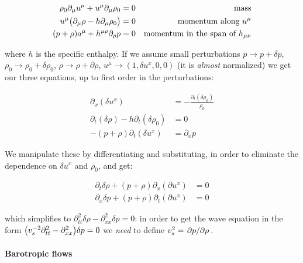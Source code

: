 \documentclass[main.tex]{subfiles}
\begin{document}
\begin{subequations}
\begin{align}
  \rho_0 \partial_\mu u^\mu + u^\mu \partial_\mu \rho_0 &= 0 & \text{mass}  \\
  u^\mu \qty(\partial_\mu \rho - h \partial_\mu \rho_0) &=0 & \text{momentum along } u^\mu  \\
  (p+\rho) a^\mu + h^{\mu \rho} \partial_\rho p &=0 & \text{momentum in the span of } h_{\mu\nu}
\end{align}
\end{subequations}

where \(h\) is the specific enthalpy. If we assume small perturbations \(p \rightarrow p + \delta p\), \(\rho_0 \rightarrow \rho_0 + \delta \rho_0\), \(\rho \rightarrow \rho + \partial \rho\), \(u^\mu \rightarrow (1, \delta u^x, 0, 0)\) (it is \emph{almost} normalized) we get our three equations, up to first order in the perturbations:

\begin{subequations}
\begin{align}
  \partial_x (\delta u^x) &= -\frac{\partial_t (\delta \rho_0)}{\rho_0}  \\
  \partial_t (\delta \rho) - h \partial_t (\delta \rho_0) &= 0  \\
  -(p+ \rho) \partial_t (\delta u^x) &= \partial_x p
\end{align}
\end{subequations}

We manipulate these by differentiating and substituting, in order to eliminate the dependence on \(\delta u^x\) and \(\rho_0\), and get:

\begin{subequations}
\begin{align}
  \partial_t \delta \rho + (p+\rho) \partial_x (\partial u^x) &= 0 \\
  \partial_x \delta p + (p+\rho) \partial_t (\partial u^x) &= 0
\end{align}
\end{subequations}

which simplifies to \(\partial_{tt}^2 \delta \rho - \partial_{xx}^2 \delta p = 0\): in order to get the wave equation in the form \(\qty(v_s^{-2} \partial_{tt}^2 - \partial_{xx}^2 ) \delta p = 0\) we \emph{need} to define \(v_s^2 = \pdv*{p}{\rho}\).

\paragraph{Barotropic flows}
\end{document}

